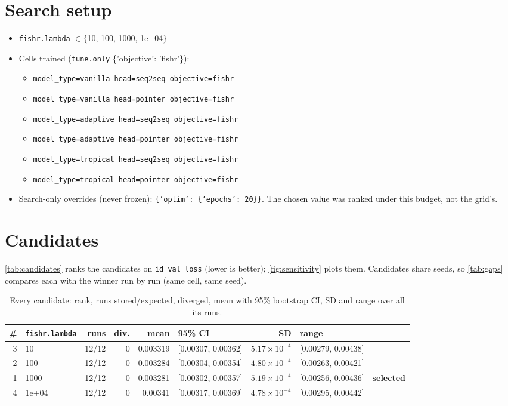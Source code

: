 \documentclass[10pt]{article}
\begin{document}
\section{Search setup}
\begin{itemize}\setlength\itemsep{0pt}
\item \texttt{fishr.lambda} $\in \{$10, 100, 1000, 1e+04$\}$
\item Cells trained (\texttt{tune.only} \{'objective': 'fishr'\}):
\begin{itemize}\setlength\itemsep{0pt}
\item \texttt{model\_type=vanilla head=seq2seq objective=fishr}
\item \texttt{model\_type=vanilla head=pointer objective=fishr}
\item \texttt{model\_type=adaptive head=seq2seq objective=fishr}
\item \texttt{model\_type=adaptive head=pointer objective=fishr}
\item \texttt{model\_type=tropical head=seq2seq objective=fishr}
\item \texttt{model\_type=tropical head=pointer objective=fishr}
\end{itemize}
\item Search-only overrides (never frozen): \texttt{\{'optim': \{'epochs': 20\}\}}. The chosen value was ranked under this budget, not the grid's.
\end{itemize}

\section{Candidates}
\autoref{tab:candidates} ranks the candidates on \texttt{id\_val\_loss} (lower is better); \autoref{fig:sensitivity} plots them.
Candidates share seeds, so \autoref{tab:gaps} compares each with the winner run by run (same cell, same seed).

{\small
\begin{longtable}{rlrrrlrll}
\caption{Every candidate: rank, runs stored/expected, diverged, mean with 95\% bootstrap CI, SD and range over all its runs.}\label{tab:candidates}\\
\toprule
\# & \texttt{fishr.lambda} & runs & div. & mean & 95\% CI & SD & range & \\
\midrule
\endhead
3 & 10 & 12/12 & 0 & 0.003319 & [0.00307, 0.00362] & $5.17\times10^{-4}$ & [0.00279, 0.00438] & \\
2 & 100 & 12/12 & 0 & 0.003284 & [0.00304, 0.00354] & $4.80\times10^{-4}$ & [0.00263, 0.00421] & \\
1 & 1000 & 12/12 & 0 & 0.003281 & [0.00302, 0.00357] & $5.19\times10^{-4}$ & [0.00256, 0.00436] & \textbf{selected}\\
4 & 1e+04 & 12/12 & 0 & 0.00341 & [0.00317, 0.00369] & $4.78\times10^{-4}$ & [0.00295, 0.00442] & \\
\bottomrule
\end{longtable}
}
\end{document}
